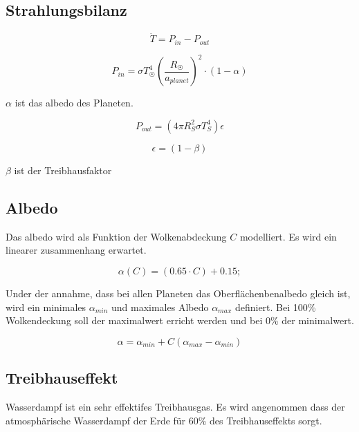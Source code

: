 \begin{refsection}
\section{Strahlungsbilanz}

\begin{equation}
\dot{T} = P_{in} - P_{out}
\end{equation}


\begin{equation}
P_{in} = \sigma T_{\astrosun}^4 \left( \frac{R_{\astrosun}}{a_{planet}} \right) ^2 \cdot (1-\alpha)
\end{equation}

$\alpha$ ist das albedo des Planeten.

\begin{equation}
P_{out} = (4 \pi R_{S}^2 \sigma T_{S}^4)\epsilon
\end{equation}

\begin{equation}
\epsilon  = (1 - \beta)
\end{equation}

$\beta$ ist der Treibhausfaktor

\subsection{Albedo}

Das albedo wird als Funktion der Wolkenabdeckung $C$ modelliert. Es wird ein linearer zusammenhang erwartet.

\begin{equation}
\alpha(C) = (0.65 \cdot C) + 0.15;
\end{equation}


Under der annahme, dass bei allen Planeten das Oberflächenbenalbedo gleich ist, wird ein minimales $\alpha_{min}$ und maximales Albedo $\alpha_{max}$ definiert. Bei 100\% Wolkendeckung soll der maximalwert erricht werden und bei 0\% der minimalwert.

\begin{equation}
\alpha = \alpha_{min} + C(\alpha_{max} - \alpha_{min})
\end{equation}

\subsection{Treibhauseffekt}

Wasserdampf ist ein sehr effektifes Treibhausgas. Es wird angenommen dass der atmosphärische Wasserdampf der Erde für 60\% des Treibhauseffekts sorgt.  


\end{refsection}
